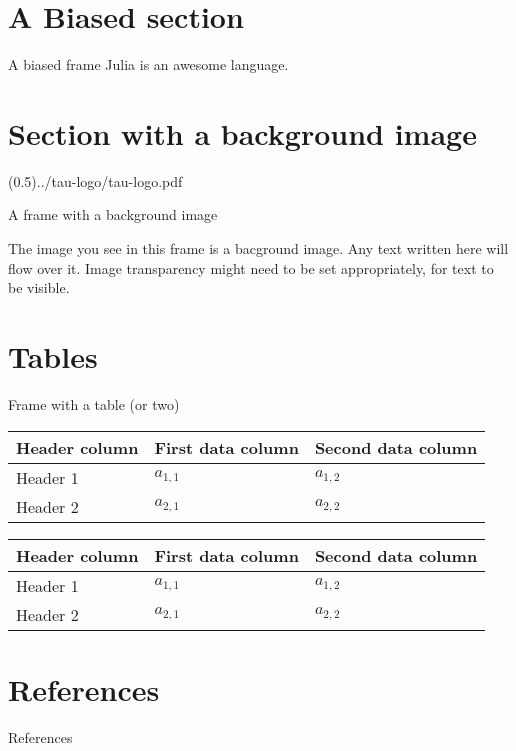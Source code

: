 \section{A Biased section}

\begin{frame}{A biased frame}
    Julia is an awesome language.~\cite{Bezanson--Edelman--Karpinski-2017}
\end{frame}

\section{Section with a background image}

\begingroup

\setbackgroundimage[0.5](0.5){../tau-logo/tau-logo.pdf}

\begin{frame}{A frame with a background image}

    The image you see in this frame is a bacground image. Any text written
    here will flow over it. Image transparency might need to be set
    appropriately, for text to be visible.

\end{frame}

\endgroup

\section{Tables}

\begin{frame}{Frame with a table (or two)}

\begin{center}
\begin{tabular}{l | l l }
\toprule
Header column & First data column & Second data column \\
\midrule
Header 1 & \(a_{1,1}\) & \(a_{1,2}\) \\
Header 2 & \(a_{2,1}\) & \(a_{2,2}\) \\
\bottomrule
\end{tabular}
\end{center}

\begin{center}
\begin{tabular}{l | l l }
\toprule
Header column & First data column & Second data column \\
\midrule
Header 1 & \(a_{1,1}\) & \(a_{1,2}\) \\
Header 2 & \(a_{2,1}\) & \(a_{2,2}\) \\
\bottomrule
\end{tabular}
\end{center}
\end{frame}

\section{References}

\begin{frame}{References}
    \printbibliography[heading=none]
\end{frame}

